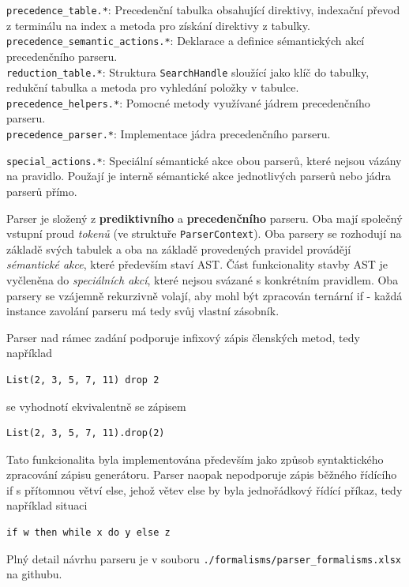 \documentclass[11pt, a4paper]{article}
\begin{document}
\texttt{precedence\_table.*}: Precedenční tabulka obsahující direktivy, indexační převod z terminálu na index a metoda pro získání direktivy z tabulky. \\
\texttt{precedence\_semantic\_actions.*}: Deklarace a definice sémantických akcí precedenčního parseru. \\
\texttt{reduction\_table.*}: Struktura \texttt{SearchHandle} sloužící jako klíč do tabulky, redukční tabulka a metoda pro vyhledání položky v tabulce. \\
\texttt{precedence\_helpers.*}: Pomocné metody využívané jádrem precedenčního parseru. \\
\texttt{precedence\_parser.*}: Implementace jádra precedenčního parseru.

\texttt{special\_actions.*}: Speciální sémantické akce obou parserů, které nejsou vázány na pravidlo. Použají je interně sémantické akce jednotlivých parserů nebo jádra parserů přímo.

Parser je složený z \textbf{prediktivního} a \textbf{precedenčního} parseru. Oba mají společný vstupní proud \emph{tokenů} (ve struktuře \texttt{ParserContext}). Oba parsery se rozhodují na základě svých tabulek a oba na základě provedených pravidel provádějí \emph{sémantické akce}, které především staví AST. Část funkcionality stavby AST je vyčleněna do \emph{speciálních akcí}, které nejsou svázané s konkrétním pravidlem. Oba parsery se vzájemně rekurzivně volají, aby mohl být zpracován ternární if - každá instance zavolání parseru má tedy svůj vlastní zásobník.

Parser nad rámec zadání podporuje infixový zápis členských metod, tedy například
\begin{lstlisting}
List(2, 3, 5, 7, 11) drop 2
\end{lstlisting}
se vyhodnotí ekvivalentně se zápisem
\begin{lstlisting}
List(2, 3, 5, 7, 11).drop(2)
\end{lstlisting}
Tato funkcionalita byla implementována především jako způsob syntaktického zpracování zápisu generátoru. Parser naopak nepodporuje zápis běžného řídícího if s přítomnou větví else, jehož větev else by byla jednořádkový řídící příkaz, tedy například situaci
\begin{lstlisting}
if w then while x do y else z
\end{lstlisting}

Plný detail návrhu parseru je v souboru \texttt{./formalisms/parser\_formalisms.xlsx} na githubu.
\end{document}
